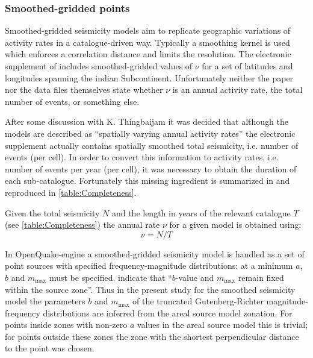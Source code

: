 \documentclass{article}
\begin{document}
\subsubsection{Smoothed-gridded points}
\label{subsubsec:Smoothed}

Smoothed-gridded seismicity models aim to replicate geographic variations of activity rates in a catalogue-driven way.
Typically a smoothing kernel is used which enforces a correlation distance and limits the resolution. The electronic supplement of \cite{nath2012probabilistic} includes smoothed-gridded values of $\nu$ for a set of latitudes and longitudes spanning the indian Subcontinent. Unfortunately neither the paper nor the data files themselves state whether $\nu$ is an annual activity rate, the total number of events, or something else.

After some discussion with K. Thingbaijam it was decided that although the models are described as ``spatially varying annual activity rates'' \cite[p.~140]{nath2012probabilistic} the electronic supplement actually contains spatially smoothed total seismicity, i.e. number of events (per cell).
In order to convert this information to activity rates, i.e. number of events per year (per cell), it was necessary to obtain the duration of each sub-catalogue.
Fortunately this missing ingredient is summarized in \cite[Table~1]{thingbaijam2011seismogenic} and reproduced in \autoref{table:Completeness}.

Given the total seismicity $N$ and the length in years of the relevant catalogue $T$ (see \autoref{table:Completeness}) the annual rate $\nu$ for a given model is obtained using:
\begin{equation} \label{eq:SeismicityToActivity} 
\nu = N/T 
\end{equation}

In OpenQuake-engine a smoothed-gridded seismicity model is handled as a set of point sources with specified frequency-magnitude distributions: at a minimum $a$, $b$ and $m_\text{max}$ must be specified.
\cite{nath2012probabilistic} indicate that ``$b$-value and $m_\text{max}$ remain fixed within the source zone''.
Thus in the present study for the smoothed seismicity model the parameters $b$ and $m_\text{max}$ of the truncated Gutenberg-Richter magnitude-frequency distributions are inferred from the areal source model zonation.
For points inside zones with non-zero $a$ values in the areal source model this is trivial; for points outside these zones the zone with the shortest perpendicular distance to the point was chosen.
\end{document}
